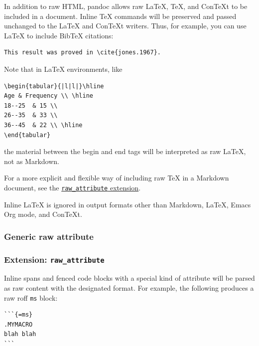 \documentclass[
]{article}
\begin{document}
In addition to raw HTML, pandoc allows raw LaTeX, TeX, and ConTeXt to be
included in a document. Inline TeX commands will be preserved and passed
unchanged to the LaTeX and ConTeXt writers. Thus, for example, you can
use LaTeX to include BibTeX citations:

\begin{verbatim}
This result was proved in \cite{jones.1967}.
\end{verbatim}

Note that in LaTeX environments, like

\begin{verbatim}
\begin{tabular}{|l|l|}\hline
Age & Frequency \\ \hline
18--25  & 15 \\
26--35  & 33 \\
36--45  & 22 \\ \hline
\end{tabular}
\end{verbatim}

the material between the begin and end tags will be interpreted as raw
LaTeX, not as Markdown.

For a more explicit and flexible way of including raw TeX in a Markdown
document, see the
\protect\hyperlink{extension-raw_attribute}{\texttt{raw\_attribute}
extension}.

Inline LaTeX is ignored in output formats other than Markdown, LaTeX,
Emacs Org mode, and ConTeXt.

\hypertarget{generic-raw-attribute}{%
\subsubsection{Generic raw attribute}\label{generic-raw-attribute}}

\hypertarget{extension-raw_attribute}{%
\subsubsection{\texorpdfstring{Extension:
\texttt{raw\_attribute}}{Extension: raw\_attribute}}\label{extension-raw_attribute}}

Inline spans and fenced code blocks with a special kind of attribute
will be parsed as raw content with the designated format. For example,
the following produces a raw roff \texttt{ms} block:

\begin{verbatim}
```{=ms}
.MYMACRO
blah blah
```
\end{verbatim}
\end{document}
